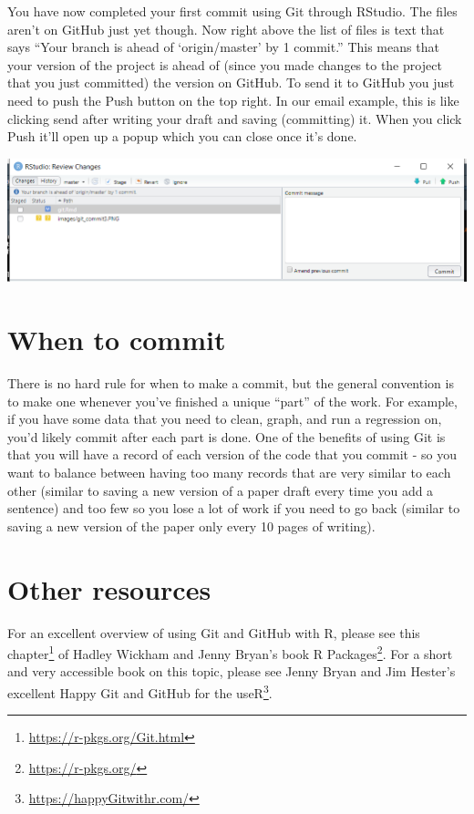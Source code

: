 \documentclass[
]{krantz}
\renewcommand{\href}[2]{#2\footnote{\url{#1}}}
\begin{document}
You have now completed your first commit using Git through RStudio. The files aren't on GitHub just yet though. Now right above the list of files is text that says ``Your branch is ahead of `origin/master' by 1 commit.'' This means that your version of the project is ahead of (since you made changes to the project that you just committed) the version on GitHub. To send it to GitHub you just need to push the Push button on the top right. In our email example, this is like clicking send after writing your draft and saving (committing) it. When you click Push it'll open up a popup which you can close once it's done.

\includegraphics{images/git_commit4.PNG}

\hypertarget{when-to-commit}{%
\section{When to commit}\label{when-to-commit}}

There is no hard rule for when to make a commit, but the general convention is to make one whenever you've finished a unique ``part'' of the work. For example, if you have some data that you need to clean, graph, and run a regression on, you'd likely commit after each part is done. One of the benefits of using Git is that you will have a record of each version of the code that you commit - so you want to balance between having too many records that are very similar to each other (similar to saving a new version of a paper draft every time you add a sentence) and too few so you lose a lot of work if you need to go back (similar to saving a new version of the paper only every 10 pages of writing).

\hypertarget{other-resources}{%
\section{Other resources}\label{other-resources}}

For an excellent overview of using Git and GitHub with R, please see \href{https://r-pkgs.org/Git.html}{this chapter} of Hadley Wickham and Jenny Bryan's book \href{https://r-pkgs.org/}{R Packages}. For a short and very accessible book on this topic, please see Jenny Bryan and Jim Hester's excellent \href{https://happyGitwithr.com/}{Happy Git and GitHub for the useR}.

  

\backmatter
\printindex
\end{document}
